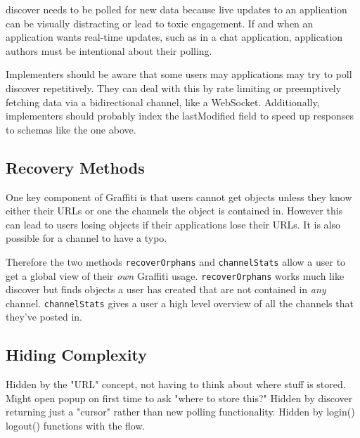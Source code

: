 discover needs to be polled for new data because live updates to an application can be visually distracting or lead to toxic engagement. If and when an application wants real-time updates, such as in a chat application, application authors must be intentional about their polling.

Implementers should be aware that some users may applications may try to poll discover repetitively. They can deal with this by rate limiting or preemptively fetching data via a bidirectional channel, like a WebSocket. Additionally, implementers should probably index the lastModified field to speed up responses to schemas like the one above.

\subsection{Recovery Methods}

One key component of Graffiti is that users cannot get objects
unless they know either their URLs or one the channels the object
is contained in.
However this can lead to users losing objects if their applications
lose their URLs. It is also possible for a channel to have a typo.

Therefore the two methods \texttt{recoverOrphans} and \texttt{channelStats}
allow a user to get a global view of their \emph{own} Graffiti usage.
\texttt{recoverOrphans} works much like discover but finds objects
a user has created that are not contained in \emph{any} channel.
\texttt{channelStats} gives a user a high level overview of all the
channels that they've posted in.

\subsection{Hiding Complexity}

Hidden by the "URL" concept, not having to think about where stuff is stored.
Might open popup on first time to ask "where to store this?"
Hidden by discover returning just a "cursor" rather than new polling functionality.
Hidden by login() logout() functions with the flow.
